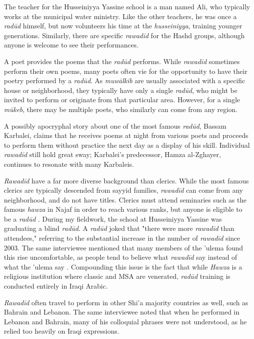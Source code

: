 The teacher for the Husseiniyya Yassine school is a man named Ali, who typically works at the municipal water ministry. Like the other teachers, he was once a \emph{radūd} himself, but now volunteers his time at the \emph{husseiniyya}, training younger generations. Similarly, there are specific \emph{rawadīd} for the Hashd groups, although anyone is welcome to see their performances. 

A poet provides the poems that the \emph{radūd} performs. While \emph{rawadīd} sometimes perform their own poems, many poets often vie for the opportunity to have their poetry performed by a \emph{radūd}. As \emph{muwālkib} are usually associated with a specific house or neighborhood, they typically have only a single \emph{radūd}, who might be invited to perform or originate from that particular area. However, for a single \emph{mūkeb}, there may be multiple poets, who similarly can come from any region. 

A possibly apocryphal story about one of the most famous \emph{radūd}, Bassam Karbalei, claims that he receives poems at night from various poets and proceeds to perform them without practice the next day as a display of his skill\cite{al-husseini_interview_2022}. Individual \emph{rawadīd} still hold great sway; Karbalei's predecessor, Hamza al-Zghayer, continues to resonate with many Karbaleis. 

\emph{Rawadīd} have a far more diverse background than clerics. While the most famous clerics are typically descended from sayyid families, \emph{rawadīd} can come from any neighborhood, and do not have titles. Clerics must attend seminaries such as the famous \emph{hawza} in Najaf in order to reach various ranks, but anyone is eligible to be a \emph{radūd} \cite{al-husseini_interview_2022}. During my fieldwork, the school at Husseiniyya Yassine was graduating a blind \emph{radūd}. A \emph{radūd} joked that "there were more \emph{rawadīd} than attendees," referring to the substantial increase in the number of \emph{rawadīd} since 2003. The same interviewee mentioned that many members of the 'ulema found this rise uncomfortable, as people tend to believe what \emph{rawadīd} say instead of what the 'ulema say \cite{al-husseini_interview_2022}. Compounding this issue is the fact that while \emph{Hawza} is a religious institution where classic and MSA are venerated, \emph{radūd} training is conducted entirely in Iraqi Arabic. 

\emph{Rawadīd} often travel to perform in other Shi'a majority countries as well, such as Bahrain and Lebanon. The same interviewee noted that when he performed in Lebanon and Bahrain, many of his colloquial phrases were not understood, as he relied too heavily on Iraqi expressions.

